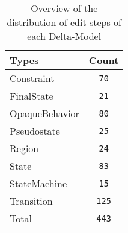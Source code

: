 \begin{table} 
 \center 
 \small 
\begin{tabular}{|l|c|}
\hline
Types & Count\\ 
  \hline 
Constraint & \texttt{70}\\ 
  \hline 
FinalState & \texttt{21}\\ 
  \hline 
OpaqueBehavior & \texttt{80}\\ 
  \hline 
Pseudostate & \texttt{25}\\ 
  \hline 
Region & \texttt{24}\\ 
  \hline 
State & \texttt{83}\\ 
  \hline 
StateMachine & \texttt{15}\\ 
  \hline 
Transition & \texttt{125}\\ 
  \hline 
Total & \texttt{443}\\ 
  \hline 
\end{tabular}
\caption[Overview: Delta-Models]{Overview of the distribution of edit steps of each Delta-Model}
\end{table}

